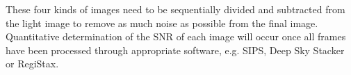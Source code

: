 These four kinds of images need to be sequentially divided and subtracted from the light image to remove as much noise as possible from the final image. Quantitative determination of the SNR of each image will occur once all frames have been processed through appropriate software, e.g. SIPS, Deep Sky Stacker or RegiStax.
